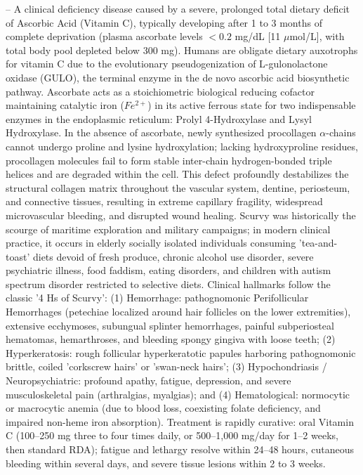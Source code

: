 -- A clinical deficiency disease caused by a severe, prolonged total dietary deficit of Ascorbic Acid (Vitamin C), typically developing after 1 to 3 months of complete deprivation (plasma ascorbate levels $<0.2$ mg/dL [11 $\mu$mol/L], with total body pool depleted below 300 mg). Humans are obligate dietary auxotrophs for vitamin C due to the evolutionary pseudogenization of L-gulonolactone oxidase (GULO), the terminal enzyme in the de novo ascorbic acid biosynthetic pathway. Ascorbate acts as a stoichiometric biological reducing cofactor maintaining catalytic iron ($Fe^{2+}$) in its active ferrous state for two indispensable enzymes in the endoplasmic reticulum: Prolyl 4-Hydroxylase and Lysyl Hydroxylase. In the absence of ascorbate, newly synthesized procollagen $\alpha$-chains cannot undergo proline and lysine hydroxylation; lacking hydroxyproline residues, procollagen molecules fail to form stable inter-chain hydrogen-bonded triple helices and are degraded within the cell. This defect profoundly destabilizes the structural collagen matrix throughout the vascular system, dentine, periosteum, and connective tissues, resulting in extreme capillary fragility, widespread microvascular bleeding, and disrupted wound healing. Scurvy was historically the scourge of maritime exploration and military campaigns; in modern clinical practice, it occurs in elderly socially isolated individuals consuming 'tea-and-toast' diets devoid of fresh produce, chronic alcohol use disorder, severe psychiatric illness, food faddism, eating disorders, and children with autism spectrum disorder restricted to selective diets. Clinical hallmarks follow the classic '4 Hs of Scurvy': (1) Hemorrhage: pathognomonic Perifollicular Hemorrhages (petechiae localized around hair follicles on the lower extremities), extensive ecchymoses, subungual splinter hemorrhages, painful subperiosteal hematomas, hemarthroses, and bleeding spongy gingiva with loose teeth; (2) Hyperkeratosis: rough follicular hyperkeratotic papules harboring pathognomonic brittle, coiled 'corkscrew hairs' or 'swan-neck hairs'; (3) Hypochondriasis / Neuropsychiatric: profound apathy, fatigue, depression, and severe musculoskeletal pain (arthralgias, myalgias); and (4) Hematological: normocytic or macrocytic anemia (due to blood loss, coexisting folate deficiency, and impaired non-heme iron absorption). Treatment is rapidly curative: oral Vitamin C (100--250 mg three to four times daily, or 500--1,000 mg/day for 1--2 weeks, then standard RDA); fatigue and lethargy resolve within 24--48 hours, cutaneous bleeding within several days, and severe tissue lesions within 2 to 3 weeks.

